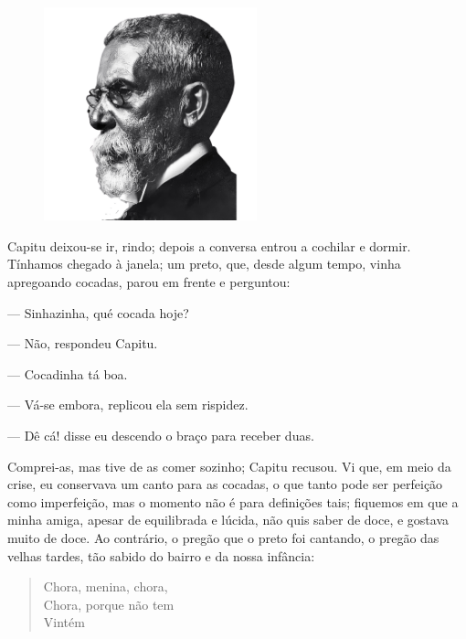 \begin{myquote}

\begin{figure}  %
  \centering
  \includegraphics[width=0.55\textwidth]{./imgSAEB_7_POR/media/image57.png}
\end{figure}

Capitu deixou-se ir, rindo; depois a conversa entrou a cochilar e
dormir. Tínhamos chegado à janela; um preto, que, desde algum
tempo, vinha apregoando cocadas, parou em frente e perguntou:

--- Sinhazinha, qué cocada hoje?

--- Não, respondeu Capitu.

--- Cocadinha tá boa.

--- Vá-se embora, replicou ela sem rispidez.

--- Dê cá! disse eu descendo o braço para receber duas.

Comprei-as, mas tive de as comer sozinho; Capitu recusou. Vi
que, em meio da crise, eu conservava um canto para as cocadas, o
que tanto pode ser perfeição como imperfeição, mas o momento
não é para definições tais; fiquemos em que a minha amiga,
apesar de equilibrada e lúcida, não quis saber de doce, e gostava
muito de doce. Ao contrário, o pregão que o preto foi cantando, o
pregão das velhas tardes, tão sabido do bairro e da nossa infância:

\begin{verse}
Chora, menina, chora, \\
Chora, porque não tem \\
Vintém
\end{verse}


\end{myquote}

